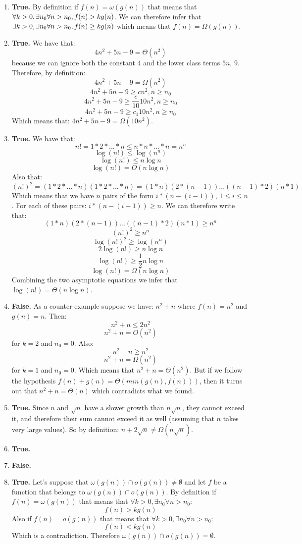 \documentclass[12pt]{article}
\begin{document}
\begin{enumerate}
\item \textbf{True.} By definition if $f(n) = \omega(g(n))$ that means that $\forall k > 0, \exists n_0 \break \forall n > n_0, f(n) > kg(n)$. We can therefore infer that $\exists k > 0, \exists n_0 \break \forall n > n_0, f(n) \geq kg(n)$ which means that $f(n) = \Omega(g(n))$.

\item \textbf{True.} We have that: $$4n^2 + 5n - 9 = \Theta(n^2)$$ because we can ignore both the constant $4$ and the lower class terms $5n$, $9$. Therefore, by definition: $$4n^2 + 5n - 9 = \Omega(n^2)$$ $$4n^2 + 5n - 9 \geq cn^2 , n \geq n_0$$ $$4n^2 + 5n - 9 \geq \frac{c}{10} 10n^2, n \geq n_0$$ $$4n^2 +5n - 9 \geq c_1 10n^2, n \geq n_0$$ Which means that: $4n^2 + 5n - 9 = \Omega(10n^2)$.

\item \textbf{True.} We have that: $$n! = 1*2*...*n \leq n*n*...*n = n^n$$ $$\log (n!) \leq \log (n^n)$$ $$\log (n!) \leq n\log n$$ $$\log (n!) = O(n\log n) $$ Also that: $$(n!)^2 = (1*2*...*n)(1*2*...*n) = (1*n)(2*(n-1))...((n-1)*2)(n*1)$$ Which means that we have $n$ pairs of the form $i*(n-(i-1))$, $1 \leq i \leq n$. For each of these pairs: $i*(n-(i-1)) \geq n$. \newline We can therefore write that: $$ (1*n)(2*(n-1))...((n-1)*2)(n*1) \geq n^n$$ $$ (n!)^2 \geq n^n$$ $$\log (n!)^2 \geq \log (n^n) $$ $$ 2\log (n!) \geq n\log n$$ $$ \log (n!) \geq \frac{1}{2} n\log n$$ $$\log (n!) = \Omega(n\log n)$$ Combining the two asymptotic equations we infer that $\log (n!) = \Theta(n\log n)$.
 
\item \textbf{False.} As a counter-example suppose we have: $n^2 + n$ where $f(n) = n^2$ and $g(n) = n$. Then: $$n^2 + n \leq 2n^2$$ $$n^2 + n = O(n^2)$$ for $k = 2$ and $n_0 = 0$. Also: $$n^2 + n \geq n^2$$ $$n^2 + n = \Omega(n^2)$$ for $k = 1$ and $n_0 = 0$. Which means that $n^2 + n = \Theta(n^2)$. But if we follow the hypothesis $f(n) + g(n) = \Theta(min(g(n),f(n)))$, then it turns out that $n^2 + n = \Theta(n)$ which contradicts what we found.

\item \textbf{True.} Since $n$ and $\sqrt{n}$ have a slower growth than $n\sqrt{n}$, they cannot exceed it, and therefore their sum cannot exceed it as well (assuming that $n$ takes very large values). So by definition: $n + 2\sqrt{n} \neq \Omega(n\sqrt{n})$.

\item \textbf{True.}

\item \textbf{False.}

\item \textbf{True.} Let's suppose that $\omega(g(n)) \cap o(g(n)) \neq \emptyset$ and let $f$ be a function that belongs to $\omega(g(n)) \cap o(g(n))$.
By definition if $f(n) = \omega(g(n))$ that means that $\forall k > 0, \exists n_0 \forall n > n_0$: $$f(n) > kg(n)$$Also if $f(n) = o(g(n))$ that means that $\forall k > 0, \exists n_0\forall n > n_0$: $$f(n) < kg(n)$$ Which is a contradiction. Therefore  $\omega(g(n)) \cap o(g(n)) = \emptyset$.
\end{enumerate}
\end{document}
